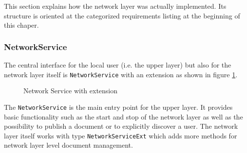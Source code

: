 This section explains how the network layer was actually implemented. Its structure is oriented at the categorized requirements listing at the beginning of this chaper.

\subsubsection{NetworkService}
The central interface for the local user (i.e. the upper layer) but also for the network layer itself is \texttt{NetworkService} with an extension as shown in figure \ref{fig:network.discovery.networkservice.uml}.

\begin{figure}[H]
 \centering
 \caption{Network Service with extension}
 \label{fig:network.discovery.networkservice.uml}
\end{figure}

The \texttt{NetworkService} is the main entry point for the upper layer. It provides basic functionality such as the start and stop of the network layer as well as the possibility to publish a document or to explicitly discover a user. The network layer itself works with type \texttt{NetworkServiceExt} which adds more methods for network layer level document management.

